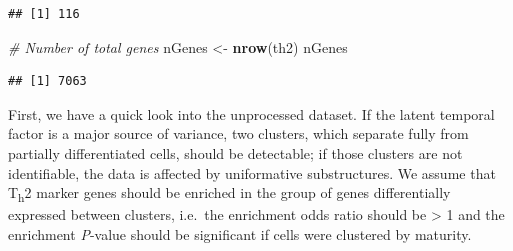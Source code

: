 \documentclass[]{book}
\newenvironment{Shaded}{\begin{snugshade}}{\end{snugshade}}
\newcommand{\KeywordTok}[1]{\textcolor[rgb]{0.13,0.29,0.53}{\textbf{#1}}}
\newcommand{\StringTok}[1]{\textcolor[rgb]{0.31,0.60,0.02}{#1}}
\newcommand{\CommentTok}[1]{\textcolor[rgb]{0.56,0.35,0.01}{\textit{#1}}}
\newcommand{\OperatorTok}[1]{\textcolor[rgb]{0.81,0.36,0.00}{\textbf{#1}}}
\newcommand{\NormalTok}[1]{#1}
\theoremstyle{definition}
\theoremstyle{definition}
\theoremstyle{definition}
\theoremstyle{remark}
\begin{document}
\begin{Shaded}
\end{Shaded}

\begin{verbatim}
## [1] 116
\end{verbatim}

\begin{Shaded}
\begin{Highlighting}[]
\CommentTok{# Number of total genes}
\NormalTok{nGenes <-}\StringTok{ }\KeywordTok{nrow}\NormalTok{(th2)}
\NormalTok{nGenes}
\end{Highlighting}
\end{Shaded}

\begin{verbatim}
## [1] 7063
\end{verbatim}

First, we have a quick look into the unprocessed dataset. If the latent
temporal factor is a major source of variance, two clusters, which
separate fully from partially differentiated cells, should be
detectable; if those clusters are not identifiable, the data is affected
by uniformative substructures. We assume that T\textsubscript{h}2 marker
genes should be enriched in the group of genes differentially expressed
between clusters, i.e.~the enrichment odds ratio should be
\textgreater{} 1 and the enrichment \emph{P}-value should be significant
if cells were clustered by maturity.
\end{document}

